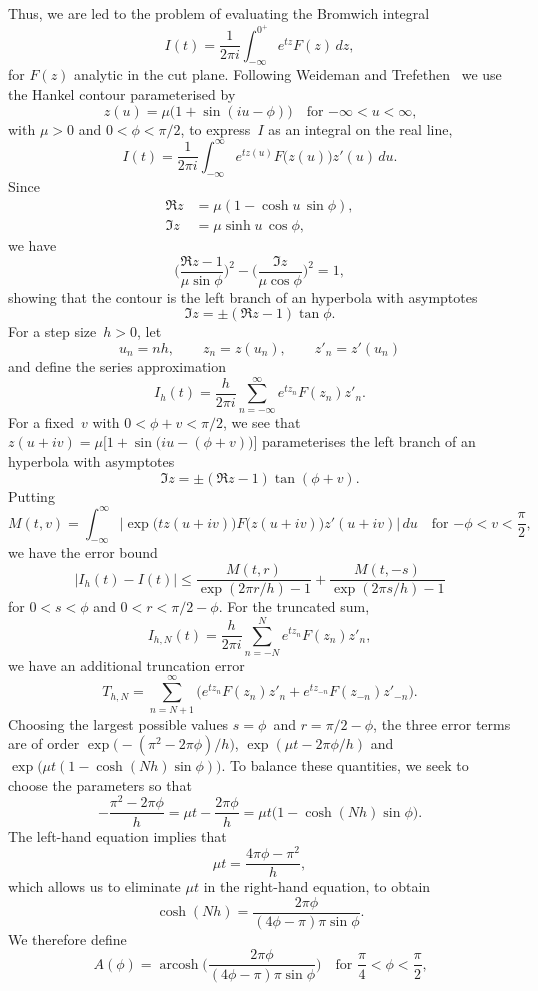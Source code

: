 \documentclass[12pt,a4paper]{article}
\newcommand{\arcosh}{\operatorname{arcosh}}
\begin{document}
Thus, we are led to the problem of evaluating the Bromwich integral
\[
I(t)=\frac{1}{2\pi i}\int_{-\infty}^{0^+}e^{tz}F(z)\,dz,
\]
for $F(z)$ analytic in the cut plane. Following Weideman and 
Trefethen~\cite{WeidemanTrefethen2007} we use the Hankel contour parameterised 
by
\[
z(u)=\mu\bigl(1+\sin(iu-\phi)\bigr)\quad\text{for $-\infty<u<\infty$,}
\]
with $\mu>0$ and $0<\phi<\pi/2$, to express~$I$ as an integral on the real line,
\[
I(t)=\frac{1}{2\pi i}\int_{-\infty}^\infty e^{tz(u)}F\bigl(z(u)\bigr)z'(u)\,du.
\]
Since
\begin{align*}
\Re z&=\mu(1-\cosh u\,\sin\phi),\\
\Im z&=\mu\sinh u\,\cos\phi,
\end{align*}
we have
\[
\biggl(\frac{\Re z-1}{\mu\sin\phi}\biggr)^2
    -\biggl(\frac{\Im z}{\mu\cos\phi}\biggr)^2=1,
\]
showing that the contour is the left branch of an hyperbola with asymptotes
\[
\Im z=\pm(\Re z-1)\tan\phi.
\]
For a step size~$h>0$, let
\[
u_n=nh,\qquad z_n=z(u_n),\qquad z'_n=z'(u_n)
\]
and define the series approximation
\[
I_h(t)=\frac{h}{2\pi i}\sum_{n=-\infty}^\infty e^{tz_n}F(z_n)z'_n.
\]
For a fixed~$v$ with $0<\phi+v<\pi/2$, we see that
$z(u+iv)=\mu\bigl[1+\sin(iu-(\phi+v)\bigr)\bigr]$ parameterises the left branch 
of an hyperbola with asymptotes
\[
\Im z=\pm(\Re z-1)\tan(\phi+v).
\]
Putting
\[
M(t,v)=\int_{-\infty}^\infty\bigl|\exp\bigl(tz(u+iv)\bigr)
    F\bigl(z(u+iv)\bigr)z'(u+iv)\bigr|\,du
    \quad\text{for $-\phi<v<\frac{\pi}{2}$,}
\]
we have the error bound~\cite[Theorem~2.1]{WeidemanTrefethen2007}
\[
|I_h(t)-I(t)|\le\frac{M(t,r)}{\exp(2\pi r/h)-1}
    +\frac{M(t,-s)}{\exp(2\pi s/h)-1}
\]
for $0<s<\phi$ and $0<r<\pi/2-\phi$.  For the truncated sum,
\[
I_{h,N}(t)=\frac{h}{2\pi i}\sum_{n=-N}^N e^{tz_n}F(z_n)z'_n,
\]
we have an additional truncation error
\[
T_{h,N}=\sum_{n=N+1}^\infty\bigl(e^{tz_n}F(z_n)z'_n
    +e^{tz_{-n}}F(z_{-n})z'_{-n}\bigr).
\]
Choosing the largest possible values $s=\phi$~and $r=\pi/2-\phi$, the three
error terms are of order $\exp\bigl(-(\pi^2-2\pi\phi)/h\bigr)$,
$\exp(\mu t-2\pi\phi/h)$ and $\exp\bigl(\mu t(1-\cosh(Nh)\sin\phi)\bigr)$.
To balance these quantities, we seek to choose the parameters so that
\cite[(4.2)]{WeidemanTrefethen2007}
\[
-\frac{\pi^2-2\pi\phi}{h}=\mu t-\frac{2\pi\phi}{h}
    =\mu t\bigl(1-\cosh(Nh)\sin\phi\bigr).
\]
The left-hand equation implies that
\[
\mu t=\frac{4\pi\phi-\pi^2}{h},
\]
which allows us to eliminate $\mu t$ in the right-hand equation, to obtain
\[
\cosh(Nh)=\frac{2\pi\phi}{(4\phi-\pi)\pi\sin\phi}.
\]
We therefore define
\[
A(\phi)=\arcosh\biggl(\frac{2\pi\phi}{(4\phi-\pi)\pi\sin\phi}\biggr)
\quad\text{for $\frac{\pi}{4}<\phi<\frac{\pi}{2}$,}
\]
\end{document}
